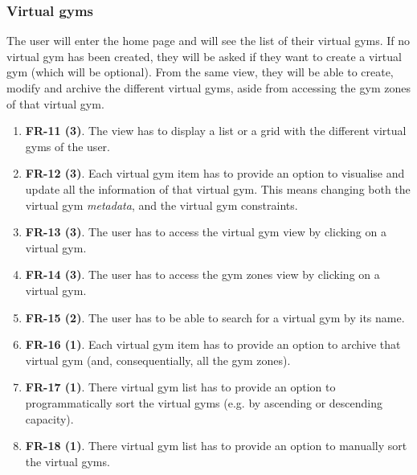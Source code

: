 \documentclass[a4paper, 12pt, oneside]{book}
\begin{document}
\subsubsection{Virtual gyms}
The user will enter the home page and will see the list of their virtual gyms. If no virtual gym has been created, they will be asked if they want to create a virtual gym (which will be optional). From the same view, they will be able to create, modify and archive the different virtual gyms, aside from accessing the gym zones of that virtual gym.
\begin{enumerate}[label = -]
	\item \textbf{FR-11 (3)}. The view has to display a list or a grid with the different virtual gyms of the user.
	\item \textbf{FR-12 (3)}. Each virtual gym item has to provide an option to visualise and update all the information of that virtual gym. This means changing both the virtual gym \emph{metadata}, and the virtual gym constraints.
	\item \textbf{FR-13 (3)}. The user has to access the virtual gym view by clicking on a virtual gym.
	\item \textbf{FR-14 (3)}. The user has to access the gym zones view by clicking on a virtual gym.
	\item \textbf{FR-15 (2)}. The user has to be able to search for a virtual gym by its name.
	\item \textbf{FR-16 (1)}. Each virtual gym item has to provide an option to archive that virtual gym (and, consequentially, all the gym zones).
	\item \textbf{FR-17 (1)}. There virtual gym list has to provide an option to programmatically sort the virtual gyms (e.g. by ascending or descending capacity).
	\item \textbf{FR-18 (1)}. There virtual gym list has to provide an option to manually sort the virtual gyms.
\end{enumerate}
\end{document}
